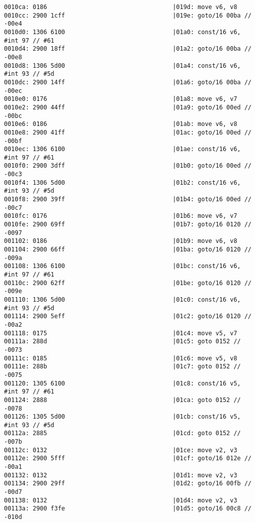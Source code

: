 \begin{lstlisting}
0010ca: 0186                                   |019d: move v6, v8
0010cc: 2900 1cff                              |019e: goto/16 00ba // -00e4
0010d0: 1306 6100                              |01a0: const/16 v6, #int 97 // #61
0010d4: 2900 18ff                              |01a2: goto/16 00ba // -00e8
0010d8: 1306 5d00                              |01a4: const/16 v6, #int 93 // #5d
0010dc: 2900 14ff                              |01a6: goto/16 00ba // -00ec
0010e0: 0176                                   |01a8: move v6, v7
0010e2: 2900 44ff                              |01a9: goto/16 00ed // -00bc
0010e6: 0186                                   |01ab: move v6, v8
0010e8: 2900 41ff                              |01ac: goto/16 00ed // -00bf
0010ec: 1306 6100                              |01ae: const/16 v6, #int 97 // #61
0010f0: 2900 3dff                              |01b0: goto/16 00ed // -00c3
0010f4: 1306 5d00                              |01b2: const/16 v6, #int 93 // #5d
0010f8: 2900 39ff                              |01b4: goto/16 00ed // -00c7
0010fc: 0176                                   |01b6: move v6, v7
0010fe: 2900 69ff                              |01b7: goto/16 0120 // -0097
001102: 0186                                   |01b9: move v6, v8
001104: 2900 66ff                              |01ba: goto/16 0120 // -009a
001108: 1306 6100                              |01bc: const/16 v6, #int 97 // #61
00110c: 2900 62ff                              |01be: goto/16 0120 // -009e
001110: 1306 5d00                              |01c0: const/16 v6, #int 93 // #5d
001114: 2900 5eff                              |01c2: goto/16 0120 // -00a2
001118: 0175                                   |01c4: move v5, v7
00111a: 288d                                   |01c5: goto 0152 // -0073
00111c: 0185                                   |01c6: move v5, v8
00111e: 288b                                   |01c7: goto 0152 // -0075
001120: 1305 6100                              |01c8: const/16 v5, #int 97 // #61
001124: 2888                                   |01ca: goto 0152 // -0078
001126: 1305 5d00                              |01cb: const/16 v5, #int 93 // #5d
00112a: 2885                                   |01cd: goto 0152 // -007b
00112c: 0132                                   |01ce: move v2, v3
00112e: 2900 5fff                              |01cf: goto/16 012e // -00a1
001132: 0132                                   |01d1: move v2, v3
001134: 2900 29ff                              |01d2: goto/16 00fb // -00d7
001138: 0132                                   |01d4: move v2, v3
00113a: 2900 f3fe                              |01d5: goto/16 00c8 // -010d

\end{lstlisting}
